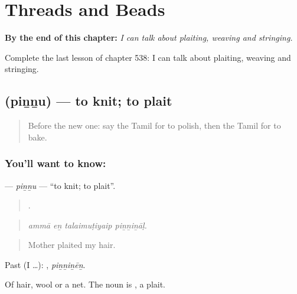 
\chapter{Threads and Beads}
\label{ch:ta-threads-and-beads}

\begin{chapteropening}
\textbf{By the end of this chapter:} \emph{I can talk about plaiting, weaving and stringing.}

Complete the last lesson of chapter 538: I can talk about plaiting, weaving and stringing.
\end{chapteropening}

\section[\texorpdfstring{\ta{பின்னு} (piṉṉu)}{பின்னு (piṉṉu)}]{ (piṉṉu) — to knit; to plait}

\label{lesson:TA-C538-pinnu}



\begin{quote}
Before the new one: say the Tamil for to polish, then the Tamil for to bake.
\end{quote}

\subsection*{You'll want to know: }
\textbf{} — \emph{piṉṉu} — \textquotedblleft{}to knit; to plait\textquotedblright{}.

\begin{quote}
   .
\end{quote}

\begin{quote}
\emph{ammā eṉ talaimuṭiyaip piṉṉiṉāḷ.}
\end{quote}

\begin{quote}
Mother plaited my hair.
\end{quote}

Past (I …): , \emph{piṉṉiṉēṉ}.

Of hair, wool or a net. The noun is , a plait.

